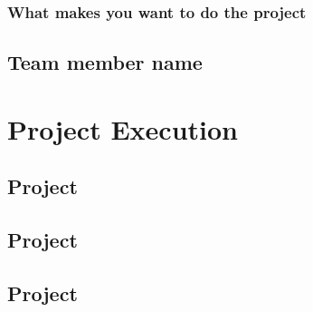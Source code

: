 \documentclass{article}
\begin{document}
	\subsubsection{What makes you want to do the project}

	\subsection{Team member name}
	
	\section{Project Execution}
	\subsection{Project }
	\subsection{Project }
	\subsection{Project }
\end{document}
